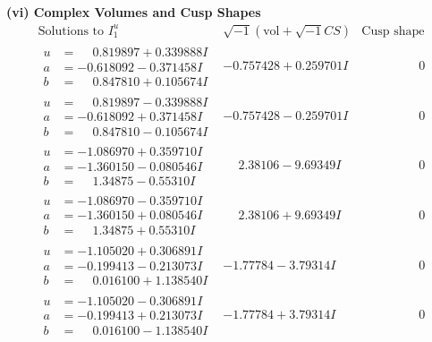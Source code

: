 \documentclass[1p]{elsarticle_modified}
\theoremstyle{definition}
\newcommand{\I}{\sqrt{-1}}
\begin{document}
\newpage\flushleft \textbf{(vi) Complex Volumes and Cusp Shapes}
$$\begin{array}{c|c|c}  
\text{Solutions to }I^u_{1}& \I (\text{vol} + \sqrt{-1}CS) & \text{Cusp shape}\\
 \hline 
\begin{aligned}
u &= \phantom{-}0.819897 + 0.339888 I \\
a &= -0.618092 - 0.371458 I \\
b &= \phantom{-}0.847810 + 0.105674 I\end{aligned}
 & -0.757428 + 0.259701 I & \phantom{-0.000000 } 0 \\ \hline\begin{aligned}
u &= \phantom{-}0.819897 - 0.339888 I \\
a &= -0.618092 + 0.371458 I \\
b &= \phantom{-}0.847810 - 0.105674 I\end{aligned}
 & -0.757428 - 0.259701 I & \phantom{-0.000000 } 0 \\ \hline\begin{aligned}
u &= -1.086970 + 0.359710 I \\
a &= -1.360150 - 0.080546 I \\
b &= \phantom{-}1.34875 - 0.55310 I\end{aligned}
 & \phantom{-}2.38106 - 9.69349 I & \phantom{-0.000000 } 0 \\ \hline\begin{aligned}
u &= -1.086970 - 0.359710 I \\
a &= -1.360150 + 0.080546 I \\
b &= \phantom{-}1.34875 + 0.55310 I\end{aligned}
 & \phantom{-}2.38106 + 9.69349 I & \phantom{-0.000000 } 0 \\ \hline\begin{aligned}
u &= -1.105020 + 0.306891 I \\
a &= -0.199413 - 0.213073 I \\
b &= \phantom{-}0.016100 + 1.138540 I\end{aligned}
 & -1.77784 - 3.79314 I & \phantom{-0.000000 } 0 \\ \hline\begin{aligned}
u &= -1.105020 - 0.306891 I \\
a &= -0.199413 + 0.213073 I \\
b &= \phantom{-}0.016100 - 1.138540 I\end{aligned}
 & -1.77784 + 3.79314 I & \phantom{-0.000000 } 0 \\ \hline\begin{aligned}

\end{aligned}
\end{array}$$
\end{document}
